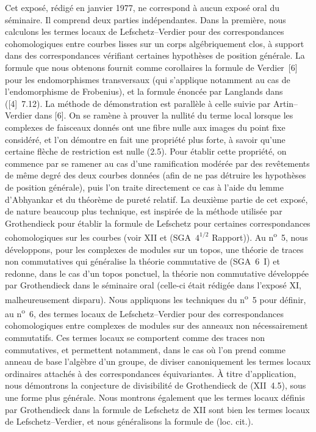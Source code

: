 \documentclass[11pt]{article}
\begin{document}
Cet exposé, rédigé en janvier 1977, ne correspond à aucun exposé oral du séminaire. Il comprend deux parties indépendantes. Dans la première, nous calculons les termes locaux de Lefschetz--Verdier pour des correspondances cohomologiques entre courbes lisses sur un corps algébriquement clos, à support dans des correspondances vérifiant certaines hypothèses de position générale. La formule que nous obtenons fournit comme corollaires la formule de Verdier~[6] pour les endomorphismes transversaux (qui s'applique notamment au cas de l'endomorphisme de Frobenius), et la formule énoncée par Langlands dans ([4]~7.12). La méthode de démonstration est parallèle à celle suivie par Artin--Verdier dans [6]. On se ramène à prouver la nullité du terme local lorsque les complexes de faisceaux donnés ont une fibre nulle aux images du point fixe considéré, et l'on démontre en fait une propriété plus forte, à savoir qu'une certaine flèche de restriction est nulle (2.5). Pour établir cette propriété, on commence par se ramener au cas d'une ramification modérée par des revêtements de même degré des deux courbes données (afin de ne pas détruire les hypothèses de position générale), puis l'on traite directement ce cas à l'aide du lemme d'Abhyankar et du théorème de pureté relatif. La deuxième partie de cet exposé, de nature beaucoup plus technique, est inspirée de la méthode utilisée par Grothendieck pour établir la formule de Lefschetz pour certaines correspondances cohomologiques sur les courbes (voir XII et (SGA~$4^{1/2}$ Rapport)). Au n\textsuperscript{o}~5, nous développons, pour les complexes de modules sur un topos, une théorie de traces non commutatives qui généralise la théorie commutative de (SGA~6~I) et redonne, dans le cas d'un topos ponctuel, la théorie non commutative développée par Grothendieck dans le séminaire oral (celle-ci était rédigée dans l'exposé XI, malheureusement disparu). Nous appliquons les techniques du n\textsuperscript{o}~5 pour définir, au n\textsuperscript{o}~6, des termes locaux de Lefschetz--Verdier pour des correspondances cohomologiques entre complexes de modules sur des anneaux non nécessairement commutatifs. Ces termes locaux se comportent comme des traces non commutatives, et permettent notamment, dans le cas où l'on prend comme anneau de base l'algèbre d'un groupe, de diviser canoniquement les termes locaux ordinaires attachés à des correspondances équivariantes. À titre d'application, nous démontrons la conjecture de divisibilité de Grothendieck de (XII~4.5), sous une forme plus générale. Nous montrons également que les termes locaux définis par Grothendieck dans la formule de Lefschetz de XII sont bien les termes locaux de Lefschetz--Verdier, et nous généralisons la formule de (loc. cit.).
\end{document}
